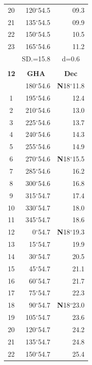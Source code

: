 \documentclass[10pt, a4paper]{report}
\begin{document}
\begin{scriptsize}
\begin{tabular*}{0.2\textwidth}[t]{@{\extracolsep{\fill}}|c|rr|}
20 & 120$^\circ$54.5 & 09.3\\
21 & 135$^\circ$54.5 & \raisebox{0.24ex}{\boldmath$\cdot$~\boldmath$\cdot$~~}09.9\\
22 & 150$^\circ$54.5 & 10.5\\
23 & 165$^\circ$54.6 & 11.2\\
\hline
\rule{0pt}{2.4ex} & \multicolumn{1}{c}{SD.=15.8} & \multicolumn{1}{c|}{d=0.6}\\
\hline
\multicolumn{1}{c}{}\\[-0.5ex]\hline
\multicolumn{1}{|c|}{\rule{0pt}{2.6ex}\textbf{12}} & \multicolumn{1}{c}{\textbf{GHA}} & \multicolumn{1}{c|}{\textbf{Dec}}\\
\hline\rule{0pt}{2.6ex}\noindent
0 & 180$^\circ$54.6 & \textbf{N}18$^\circ$11.8\\
1 & 195$^\circ$54.6 & 12.4\\
2 & 210$^\circ$54.6 & 13.0\\
3 & 225$^\circ$54.6 & \raisebox{0.24ex}{\boldmath$\cdot$~\boldmath$\cdot$~~}13.7\\
4 & 240$^\circ$54.6 & 14.3\\
5 & 255$^\circ$54.6 & 14.9\\[2Pt]
6 & 270$^\circ$54.6 & \textbf{N}18$^\circ$15.5\\
7 & 285$^\circ$54.6 & 16.2\\
8 & 300$^\circ$54.6 & 16.8\\
9 & 315$^\circ$54.7 & \raisebox{0.24ex}{\boldmath$\cdot$~\boldmath$\cdot$~~}17.4\\
10 & 330$^\circ$54.7 & 18.0\\
11 & 345$^\circ$54.7 & 18.6\\[2Pt]
12 & 0$^\circ$54.7 & \textbf{N}18$^\circ$19.3\\
13 & 15$^\circ$54.7 & 19.9\\
14 & 30$^\circ$54.7 & 20.5\\
15 & 45$^\circ$54.7 & \raisebox{0.24ex}{\boldmath$\cdot$~\boldmath$\cdot$~~}21.1\\
16 & 60$^\circ$54.7 & 21.7\\
17 & 75$^\circ$54.7 & 22.3\\[2Pt]
18 & 90$^\circ$54.7 & \textbf{N}18$^\circ$23.0\\
19 & 105$^\circ$54.7 & 23.6\\
20 & 120$^\circ$54.7 & 24.2\\
21 & 135$^\circ$54.7 & \raisebox{0.24ex}{\boldmath$\cdot$~\boldmath$\cdot$~~}24.8\\
22 & 150$^\circ$54.7 & 25.4\\

\end{tabular*}
\end{scriptsize}
\end{document}
